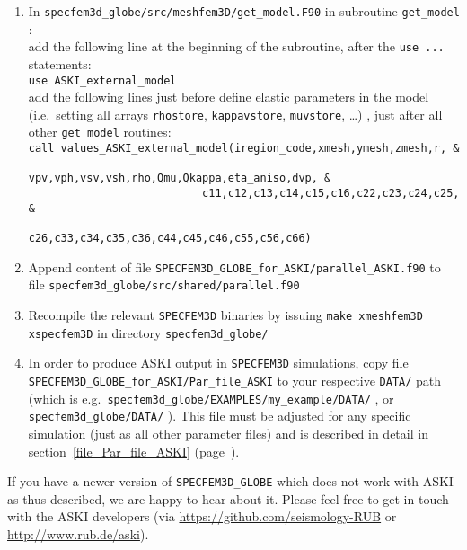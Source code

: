 \documentclass[12pt,a4paper]{article}
\newcommand{\lcode}[1]{\nolinkurl{#1}}
\newcommand{\ASKI}{ {\ttfamily ASKI} }
\newcommand{\myref}[1]{\ref{#1} (page~\pageref{#1})}
\begin{document}
\begin{enumerate}
 \item In \lcode{specfem3d_globe/src/meshfem3D/get_model.F90} in subroutine \lcode{get_model} : \\
   add the following line at the beginning of the subroutine, after the \lcode{use ...} statements:\\
   \lcode{use ASKI_external_model}\\
   add the following lines just before define elastic parameters in the model (i.e.\ setting all 
   arrays \lcode{rhostore}, \lcode{kappavstore}, \lcode{muvstore}, \dots) , just after all other 
   \lcode{get model} routines:\\
   \lcode{call values_ASKI_external_model(iregion_code,xmesh,ymesh,zmesh,r, &}\\
   \lcode{                           vpv,vph,vsv,vsh,rho,Qmu,Qkappa,eta_aniso,dvp, &}\\
   \lcode{                           c11,c12,c13,c14,c15,c16,c22,c23,c24,c25, &}\\
   \lcode{                           c26,c33,c34,c35,c36,c44,c45,c46,c55,c56,c66)}

 \item Append content of file \lcode{SPECFEM3D_GLOBE_for_ASKI/parallel_ASKI.f90} 
   to file \lcode{specfem3d_globe/src/shared/parallel.f90}

\item Recompile the relevant \lcode{SPECFEM3D} binaries by issuing \lcode{make xmeshfem3D xspecfem3D} 
  in directory \lcode{specfem3d_globe/}

\item In order to produce \ASKI{} output in \lcode{SPECFEM3D} simulations, copy file 
    \lcode{SPECFEM3D_GLOBE_for_ASKI/Par_file_ASKI} to your respective \lcode{DATA/} path
    (which is e.g.\ \lcode{specfem3d_globe/EXAMPLES/my_example/DATA/} , or \lcode{specfem3d_globe/DATA/} ). This 
    file must be adjusted for any specific simulation (just as all other parameter files) and is described in 
    detail in section~\myref{file_Par_file_ASKI}.

\end{enumerate}

If you have a newer version of \lcode{SPECFEM3D_GLOBE} which does not work with \ASKI{} as thus described, we
are happy to hear about it. Please feel free to get in touch with the \ASKI{} developers (via
\url{https://github.com/seismology-RUB} or \url{http://www.rub.de/aski}). 

%
\end{document}
